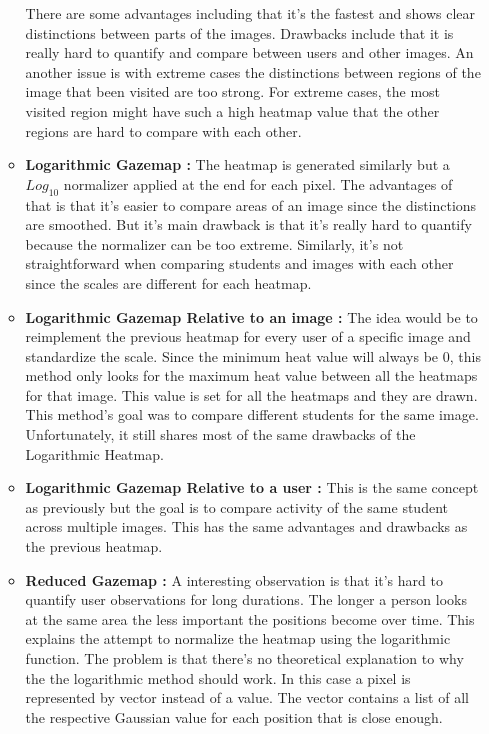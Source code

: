 \documentclass[a4paper,11pt]{report}
\numberwithin{figure}{section} %
\begin{document}
\begin{itemize}
\begin{itemize}
            There are some advantages including that it's the fastest and shows clear distinctions between parts of the images.
            Drawbacks include that it is really hard to quantify and compare between users and other images.
            An another issue is with extreme cases the distinctions between regions of the image that been visited are too strong.
            For extreme cases, the most visited region might have such a high heatmap value that the other regions are hard to compare with each other.
            \item \textbf{Logarithmic Gazemap :} The heatmap is generated similarly but a $Log_{10}$ normalizer applied at the end for each pixel.
            The advantages of that is that it's easier to compare areas of an image since the distinctions are smoothed.
            But it's main drawback is that it's really hard to quantify because the normalizer can be too extreme.
            Similarly, it's not straightforward when comparing students and images with each other since the scales are different for each heatmap.
            \item \textbf{Logarithmic Gazemap Relative to an image :} The idea would be to reimplement the previous heatmap for every user of a specific image and standardize the scale.
            Since the minimum heat value will always be 0, this method only looks for the maximum heat value between all the heatmaps for that image.
            This value is set for all the heatmaps and they are drawn. This method's goal was to compare different students for the same image.
            Unfortunately, it still shares most of the same drawbacks of the Logarithmic Heatmap.
            \item \textbf{Logarithmic Gazemap Relative to a user :} This is the same concept as previously but the goal is to compare activity of the same student across multiple images.
            This has the same advantages and drawbacks as the previous heatmap.
            \item \textbf{Reduced Gazemap :} A interesting observation is that it's hard to quantify user observations for long durations.
            The longer a person looks at the same area the less important the positions become over time.
            This explains the attempt to normalize the heatmap using the logarithmic function.
            The problem is that there's no theoretical explanation to why the the logarithmic method should work.
            In this case a pixel is represented by vector instead of a value.
            The vector contains a list of all the respective Gaussian value for each position that is close enough.

\end{itemize}
\end{itemize}
\end{document}
